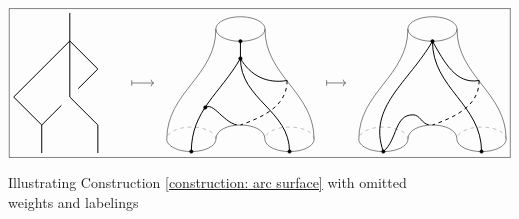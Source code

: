 \begin{figure} 
	\begin{equation*}
	\boxed{
		\begin{tikzpicture}[scale=.8]
		\draw[thick] (1,5)--(1,2)--(2,1)--(2,0);
		\draw[thick] (1,4)--(-1,2)--(0,1)--(0,0);
		\draw[thick] (1,4)--(2,3)--(1.3,2.3);
		\draw[thick] (.7,1.7)--(0,1);
		
		\draw[|->] (3.2,2.5) to (4,2.5);
		\end{tikzpicture}
		\quad
		\begin{tikzpicture}[scale=.7]
		\draw (0,.5) arc (0:180: 1  and 0.5);
		\draw (0,.5) arc (0:-180: 1 and 0.5);
		\draw[dashed,color=gray] (-2,-4) arc (0:180: 1  and 0.5);
		\draw (-2,-4) arc (0:-180: 1 and 0.5);
		\draw[dashed,color=gray] (2,-4) arc (0:180: 1  and 0.5);
		\draw (2,-4) arc (0:-180: 1 and 0.5);
		\filldraw (1,-4.5) circle (2pt);
		\filldraw (-3,-4.5) circle (2pt);
		\filldraw (-1,0) circle (2pt);
		
		\filldraw (-1,-.7) circle (2pt);
		\draw [thick] (-1,-.7)--(-1,0);
		
		\draw  (-2,.5) to [out=-90, in=90] (-4,-4);
		\draw  (0,.5) to [out=-90, in=90] (2,-4);
		\draw  (-2,-4) to [out=90, in=90] (0,-4);
		
		\draw [thick] (-1,-.7) to [out=-120, in=90] (-3,-4.5);
		\draw [thick] (-1,-.7) to [out=-90, in=90] (1,-4.5);
		\draw [thick] (-1,-.7) to [out=-60, in=190] (.9,-1.6);
		\draw [thick, dashed] (.9,-1.6) to [out=-90, in=20] (-1,-3.42);
		\draw [thick] (-2.5,-2.8) to [out=60, in=170] (-1.15,-3.41);
		
		\filldraw (-2.43,-2.7) circle (2pt);
		
		\draw[|->] (2.5,-1.7) to (3.3,-1.7);
		\end{tikzpicture}
		\quad 
		\begin{tikzpicture}[scale=.7]
		\draw (0,.5) arc (0:180: 1  and 0.5);
		\draw (0,.5) arc (0:-180: 1 and 0.5);
		\draw[dashed,color=gray] (-2,-4) arc (0:180: 1  and 0.5);
		\draw (-2,-4) arc (0:-180: 1 and 0.5);
		\draw[dashed,color=gray] (2,-4) arc (0:180: 1  and 0.5);
		\draw (2,-4) arc (0:-180: 1 and 0.5);
		\filldraw (1,-4.5) circle (2pt);
		\filldraw (-3,-4.5) circle (2pt);
		\filldraw (-1,0) circle (2pt);
		
		\draw  (-2,.5) to [out=-90, in=90] (-4,-4);
		\draw  (0,.5) to [out=-90, in=90] (2,-4);
		\draw  (-2,-4) to [out=90, in=90] (0,-4);
		
		\draw [thick] (-1,0) to [out=-120, in=110] (-3,-4.5);
		\draw [thick] (-1,0) to [out=-90, in=90] (1,-4.5);
		\draw [thick] (-1,0) to [out=-60, in=190] (.9,-1.6);
		\draw [thick, dashed] (.9,-1.6) to [out=-90, in=20] (-1,-3.42);
		\draw [thick] (-1.8,-3) to [out=0, in=170] (-1.15,-3.41);
		\draw [thick] (-1.8,-3) to [out=180, in=40] (-3,-4.5);
		\end{tikzpicture}	
	}
	\end{equation*}
	\caption{Illustrating Construction \ref{construction: arc surface} with omitted weights and labelings}
\end{figure}

